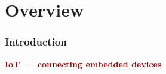\section{Overview}

	\begin{frame}[shrink]
		
		\frametitle{Introduction}
		
		\vspace{4mm}
		
		\medskip
		\begin{center}
		{\large \bfseries\textcolor{darkred}{IoT $=$ connecting embedded devices}}
		\end{center}
	
	\end{frame}